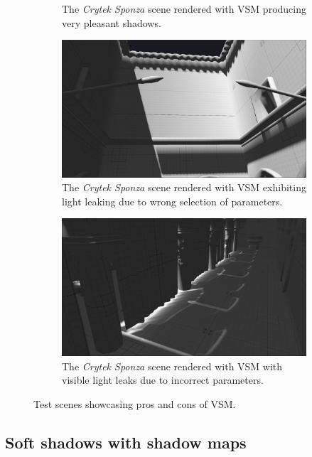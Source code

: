 \begin{figure}[h]
\begin{subfigure}[t]{0.49\textwidth}
        \caption{The \textit{Crytek Sponza} scene rendered with VSM producing very pleasant shadows.}
    \end{subfigure}
    \begin{subfigure}[t]{0.49\textwidth}
		\centering
        \includegraphics[width=\textwidth]{./graf/tests/vsm/cropped/sponza_vsm_4096_23_badsetup.png}
        \caption{The \textit{Crytek Sponza} scene rendered with VSM exhibiting light leaking due to wrong selection of parameters.}
    \end{subfigure}
	\hfill
    \begin{subfigure}[t]{0.49\textwidth}
		\centering
        \includegraphics[width=\textwidth]{./graf/tests/vsm/cropped/sponza_vsm_4096_23_leaks.png}
        \caption{The \textit{Crytek Sponza} scene rendered with VSM with visible light leaks due to incorrect parameters.}
    \end{subfigure}

    \caption{Test scenes showcasing pros and cons of VSM.}
    \label{fig:test_vsm_screens}
\end{figure}

\subsection{Soft shadows with shadow maps}

